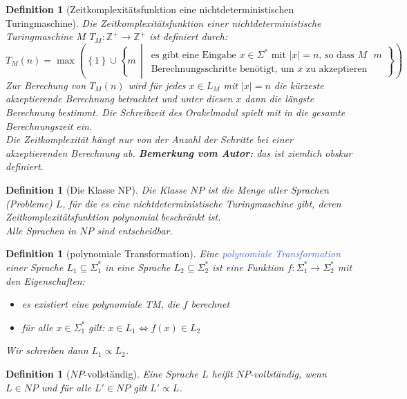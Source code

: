 \documentclass[11pt]{article}
\newcommand{\tcol}[1]{\textcolor{RoyalBlue}{#1}}
\newcommand{\set}[1]{\left\lbrace #1\right\rbrace}
\theoremstyle{break}
\newtheorem{defi}[satz]{Definition}
\begin{document}
\begin{defi}[Zeitkomplexitätsfunktion eine nichtdeterministischen Turingmaschine]
Die Zeitkomplexitätsfunktion einer nichtdeterministische Turingmaschine $M$ $T_M\colon\mathbb{Z}^+\to\mathbb{Z}^+$ ist definiert durch:
\[
T_M(n)=\max\left(\set{1}\cup\set{m\,\middle|\,
\begin{array}{c}
\text{es gibt eine Eingabe $x\in\Sigma^*$ mit $|x|=n$, so dass $M$ $m$}\\
\text{Berechnungsschritte benötigt, um $x$ zu akzeptieren}
\end{array}}\right)
\]
Zur Berechung von $T_M(n)$ wird für jedes $x\in L_M$ mit $|x|=n$ die kürzeste akzeptierende Berechnung betrachtet und unter diesen $x$ dann die längste Berechnung bestimmt. Die Schreibzeit des Orakelmodul spielt mit in die gesamte Berechnungszeit ein.\\
Die Zeitkomplexität hängt nur von der Anzahl der Schritte bei einer akzeptierenden Berechnung ab.
\textbf{Bemerkung vom Autor:} das ist ziemlich obskur definiert.
\end{defi}

\begin{defi}[Die Klasse NP]
Die Klasse $NP$ ist die Menge aller Sprachen (Probleme) $L$, für die es eine nichtdeterministische Turingmaschine gibt, deren Zeitkomplexitätsfunktion polynomial beschränkt ist.\\
Alle Sprachen in $NP$ sind entscheidbar.
\end{defi}

\begin{defi}[polynomiale Transformation]
Eine \tcol{polynomiale Transformation} einer Sprache $L_1\subseteq\Sigma_1^*$ in eine Sprache $L_2\subseteq\Sigma_2^*$ ist eine Funktion $f\colon\Sigma_1^*\to\Sigma_2^*$ mit den Eigenschaften:
\begin{itemize}
\item es existiert eine polynomiale TM, die $f$ berechnet
\item für alle $x\in\Sigma_1^*$ gilt: $x\in L_1\Leftrightarrow f(x)\in L_2$
\end{itemize}
Wir schreiben dann $L_1\propto L_2$.
\end{defi}

\begin{defi}[$NP$-vollständig]
Eine Sprache $L$ heißt $NP$-vollständig, wenn $L\in NP$ und für alle $L'\in NP$ gilt $L'\propto L$.
\end{defi}
\end{document}
